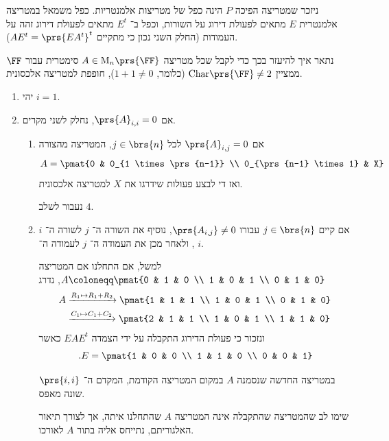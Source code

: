 \documentclass[a4paper,10pt,twoside,openany]{book}
\renewcommand{\Mat}{\mathrm{M}}
\begin{document}
\begin{algorithm}
ניזכר שמטריצה הפיכה
$P$
הינה כפל של מטריצות אלמנטריות. כפל משמאל במטריצה אלמנטרית
$E$
מתאים לפעולת דירוג על השורות, וכפל ב־%
$E^t$
מתאים לפעולת דירוג זהה על העמודות (החלק השני נכון כי מתקיים
$A E^t = \prs{E A^t}^t$).

נתאר איך להיעזר בכך כדי לקבל שכל מטריצה
$A \in \Mat_n\prs{\FF}$
סימטרית
עבור
$\FF$
ממציין
$\mathrm{Char}\prs{\FF} \neq 2$
(כלומר,
$1+1 \neq 0$),
חופפת למטריצה אלכסונית.

\begin{enumerate}
\item יהי
$i = 1$.
\item אם
$\prs{A}_{i,i} = 0$,
נחלק לשני מקרים.
\begin{enumerate}[label=2.\arabic*]
\item 
אם
$\prs{A}_{i,j} = 0$
לכל
$j \in \brs{n}$,
המטריצה מהצורה
\begin{align*}
A = \pmat{0 & 0_{1 \times \prs{n-1}} \\ 0_{\prs{n-1} \times 1} & X}
\end{align*}
ואז די לבצע פעולות שידרגו את
$X$
למטריצה אלכסונית.

נעבור לשלב
$4$.

\item
אם קיים
$j \in \brs{n}$
עבורו
$\prs{A_{i,j}} \neq 0$,
נוסיף את השורה ה־%
$j$
לשורה ה־%
$i$,
ולאחר מכן את העמודה ה־%
$j$
לעמודה ה־%
$i$.

למשל, אם התחלנו אם המטריצה
$A \coloneqq \pmat{0 & 1 & 0 \\ 1 & 0 & 1 \\ 0 & 1 & 0}$,
נדרג
\begin{align*}
A &\xrightarrow{R_1 \mapsto R_1 + R_2} \pmat{1 & 1 & 1 \\ 1 & 0 & 1 \\ 0 & 1 & 0}
\\ &\xrightarrow{C_1 \mapsto C_1 + C_2} \pmat{2 & 1 & 1 \\ 1 & 0 & 1 \\ 1 & 1 & 0}
\end{align*}
ונזכור כי פעולת הדירוג התקבלה על ידי הצמדה
$E A E^t$
כאשר
\[\text{.} E = \pmat{1 & 0 & 0 \\ 1 & 1 & 0 \\ 0 & 0 & 1}\]

במטריצה החדשה שנסמנה $A$ במקום המטריצה הקודמת, המקדם ה־%
$\prs{i,i}$
שונה מאפס.

שימו לב שהמטריצה שהתקבלה אינה המטריצה
$A$
שהתחלנו איתה,
אך לצורך תיאור האלגוריתם, נתייחס אליה בתור
$A$
לאורכו.
\end{enumerate}


\end{enumerate}
\end{algorithm}
\end{document}
